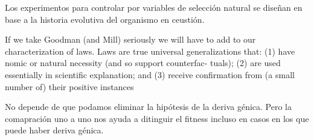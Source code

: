 Los experimentos para controlar por variables de selección natural se diseñan en base a la historia evolutiva del organismo en ceustión.


If we take Goodman (and Mill) seriously we will have to add to our
characterization of laws. Laws are true universal generalizations that:
(1) have nomic or natural necessity (and so support counterfac-
tuals);
(2) are used essentially in scientific explanation; and
(3) receive confirmation from (a small number of) their positive
instances



No depende de que podamos eliminar la hipótesis de la deriva génica. Pero la comapración uno a uno nos ayuda a ditinguir el fitness incluso en casos en los que puede haber deriva génica.
